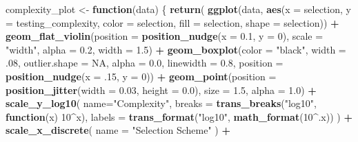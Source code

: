 \documentclass[
]{book}
\newenvironment{Shaded}{\begin{snugshade}}{\end{snugshade}}
\newcommand{\AttributeTok}[1]{\textcolor[rgb]{0.13,0.29,0.53}{#1}}
\newcommand{\ConstantTok}[1]{\textcolor[rgb]{0.56,0.35,0.01}{#1}}
\newcommand{\ControlFlowTok}[1]{\textcolor[rgb]{0.13,0.29,0.53}{\textbf{#1}}}
\newcommand{\DecValTok}[1]{\textcolor[rgb]{0.00,0.00,0.81}{#1}}
\newcommand{\FloatTok}[1]{\textcolor[rgb]{0.00,0.00,0.81}{#1}}
\newcommand{\FunctionTok}[1]{\textcolor[rgb]{0.13,0.29,0.53}{\textbf{#1}}}
\newcommand{\NormalTok}[1]{#1}
\newcommand{\OtherTok}[1]{\textcolor[rgb]{0.56,0.35,0.01}{#1}}
\newcommand{\SpecialCharTok}[1]{\textcolor[rgb]{0.81,0.36,0.00}{\textbf{#1}}}
\newcommand{\StringTok}[1]{\textcolor[rgb]{0.31,0.60,0.02}{#1}}
\begin{document}
\begin{Shaded}
\begin{Highlighting}[]
\NormalTok{complexity\_plot }\OtherTok{\textless{}{-}} \ControlFlowTok{function}\NormalTok{(data) \{ }\FunctionTok{return}\NormalTok{(}
    \FunctionTok{ggplot}\NormalTok{(data,}
    \FunctionTok{aes}\NormalTok{(}\AttributeTok{x =}\NormalTok{ selection, }\AttributeTok{y =}\NormalTok{ testing\_complexity, }\AttributeTok{color =}\NormalTok{ selection,}
                \AttributeTok{fill =}\NormalTok{ selection, }\AttributeTok{shape =}\NormalTok{ selection)) }\SpecialCharTok{+}
    \FunctionTok{geom\_flat\_violin}\NormalTok{(}\AttributeTok{position =} \FunctionTok{position\_nudge}\NormalTok{(}\AttributeTok{x =} \FloatTok{0.1}\NormalTok{, }\AttributeTok{y =} \DecValTok{0}\NormalTok{),}
                    \AttributeTok{scale =} \StringTok{"width"}\NormalTok{, }\AttributeTok{alpha =} \FloatTok{0.2}\NormalTok{, }\AttributeTok{width =} \FloatTok{1.5}\NormalTok{) }\SpecialCharTok{+}
    \FunctionTok{geom\_boxplot}\NormalTok{(}\AttributeTok{color =} \StringTok{"black"}\NormalTok{, }\AttributeTok{width =}\NormalTok{ .}\DecValTok{08}\NormalTok{, }\AttributeTok{outlier.shape =} \ConstantTok{NA}\NormalTok{,}
                \AttributeTok{alpha =} \FloatTok{0.0}\NormalTok{, }\AttributeTok{linewidth =} \FloatTok{0.8}\NormalTok{,}
                \AttributeTok{position =} \FunctionTok{position\_nudge}\NormalTok{(}\AttributeTok{x =}\NormalTok{ .}\DecValTok{15}\NormalTok{, }\AttributeTok{y =} \DecValTok{0}\NormalTok{)) }\SpecialCharTok{+}
    \FunctionTok{geom\_point}\NormalTok{(}\AttributeTok{position =} \FunctionTok{position\_jitter}\NormalTok{(}\AttributeTok{width =} \FloatTok{0.03}\NormalTok{,}
                \AttributeTok{height =} \FloatTok{0.0}\NormalTok{), }\AttributeTok{size =} \FloatTok{1.5}\NormalTok{, }\AttributeTok{alpha =} \FloatTok{1.0}\NormalTok{) }\SpecialCharTok{+}
    \FunctionTok{scale\_y\_log10}\NormalTok{(}
        \AttributeTok{name=}\StringTok{"Complexity"}\NormalTok{,}
        \AttributeTok{breaks =} \FunctionTok{trans\_breaks}\NormalTok{(}\StringTok{"log10"}\NormalTok{, }\ControlFlowTok{function}\NormalTok{(x) }\DecValTok{10}\SpecialCharTok{\^{}}\NormalTok{x),}
        \AttributeTok{labels =} \FunctionTok{trans\_format}\NormalTok{(}\StringTok{"log10"}\NormalTok{, }\FunctionTok{math\_format}\NormalTok{(}\DecValTok{10}\SpecialCharTok{\^{}}\NormalTok{.x))}
\NormalTok{    ) }\SpecialCharTok{+}
    \FunctionTok{scale\_x\_discrete}\NormalTok{(}
      \AttributeTok{name =} \StringTok{"Selection Scheme"}
\NormalTok{    ) }\SpecialCharTok{+}

\end{Highlighting}
\end{Shaded}
\end{document}

